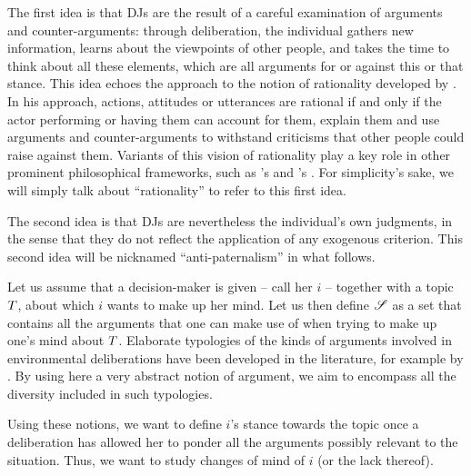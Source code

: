 \documentclass[version=3.21, pagesize, twoside=off, bibliography=totoc, DIV=calc, fontsize=12pt, a4paper, french, english]{scrartcl}
\begin{document}
The first idea is that \acp{DJ} are the result of a careful examination of arguments and counter-arguments: through deliberation, the individual gathers new information, learns about the viewpoints of other people, and takes the time to think about all these elements, 
which are all arguments for or against this or that stance. 
This idea echoes the approach to the notion of rationality developed by \citet{habermas_theorie_1981}. 
In his approach, actions, attitudes or utterances are rational if and only if the actor performing or having them can account for them, explain them and use arguments and counter-arguments to withstand criticisms that other people could raise against them. 
Variants of this vision of rationality play a key role in other prominent philosophical frameworks, such as \citeauthor{scanlon_what_2000}’s \citeyearpar{scanlon_what_2000} and \citeauthor{sen_idea_2009}’s \citeyearpar{sen_idea_2009}. 
For simplicity's sake, we will simply talk about ``rationality'' to refer to this first idea.%

The second idea is that \acp{DJ} are nevertheless the individual's own judgments, in the sense that they do not reflect the application of any exogenous criterion. 
This second idea will be nicknamed ``anti-paternalism'' in what follows. 



Let us assume that a decision-maker is given -- call her $i$ -- together with a topic $T$, about which $i$ wants to make up her mind. 
Let us then define $\mathscr{S}$ as a set that contains all the arguments that one can make use of when trying to make up one’s mind about $T$.
Elaborate typologies of the kinds of arguments involved in environmental deliberations have been developed in the literature, for example by \citet{chateauraynaud_contrainte_2007}. 
By using here a very abstract notion of argument, we aim to encompass all the diversity included in such typologies. 

Using these notions, we want to define $i$’s stance towards the topic once a deliberation has allowed her to ponder all the arguments possibly relevant to the situation. 
Thus, we want to study changes of mind of $i$ (or the lack thereof).
\end{document}
